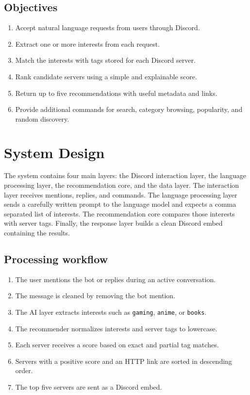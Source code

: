 \documentclass[11pt,a4paper]{article}
\begin{document}
\subsection{Objectives}
\begin{enumerate}
    \item Accept natural language requests from users through Discord.
    \item Extract one or more interests from each request.
    \item Match the interests with tags stored for each Discord server.
    \item Rank candidate servers using a simple and explainable score.
    \item Return up to five recommendations with useful metadata and links.
    \item Provide additional commands for search, category browsing, popularity, and random discovery.
\end{enumerate}

\section{System Design}

The system contains four main layers: the Discord interaction layer, the language processing layer, the recommendation core, and the data layer. The interaction layer receives mentions, replies, and commands. The language processing layer sends a carefully written prompt to the language model and expects a comma separated list of interests. The recommendation core compares those interests with server tags. Finally, the response layer builds a clean Discord embed containing the results.

\subsection{Processing workflow}
\begin{enumerate}
    \item The user mentions the bot or replies during an active conversation.
    \item The message is cleaned by removing the bot mention.
    \item The AI layer extracts interests such as \texttt{gaming}, \texttt{anime}, or \texttt{books}.
    \item The recommender normalizes interests and server tags to lowercase.
    \item Each server receives a score based on exact and partial tag matches.
    \item Servers with a positive score and an HTTP link are sorted in descending order.
    \item The top five servers are sent as a Discord embed.
\end{enumerate}
\end{document}
